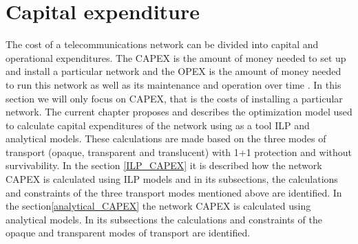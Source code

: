 
\chapter{Capital expenditure}
\label{chap_capex}
The cost of a telecommunications network can be divided into capital and operational expenditures. The CAPEX is the amount of money needed to set up and install a particular network and the OPEX is the amount of money needed to run this network as well as its maintenance and operation over time \cite{capex}\cite{opex}\cite{aulas}. In this section we will only focus on CAPEX, that is the costs of installing a particular network.
The current chapter proposes and describes the optimization model used to calculate capital expenditures of the network using as a tool ILP and analytical models. These calculations are made based on the three modes of transport (opaque, transparent and translucent) with 1+1 protection and without survivability.
In the section \ref{ILP_CAPEX} it is described how the network CAPEX is calculated using ILP models and in its subsections, the calculations and constraints of the three transport modes mentioned above are identified.
In the section\ref{analytical_CAPEX} the network CAPEX is calculated using analytical models. In its subsections the calculations and constraints of the opaque and transparent modes of transport are identified.











